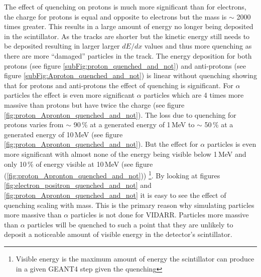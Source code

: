 The effect of quenching on protons is much more significant than for electrons, the charge for protons is equal and opposite to electrons but the mass is $\sim$ 2000 times greater. This results in a large amount of energy no longer being deposited in the scintillator. As the tracks are shorter but the kinetic energy still needs to be deposited resulting in larger larger $dE/dx$ values and thus more quenching as there are more ``damaged'' particles in the track. The energy deposition for both protons (see figure \ref{subFig:proton_quenched_and_not}) and anti-protons (see figure \ref{subFig:Aproton_quenched_and_not}) is linear without quenching showing that for protons and anti-protons the effect of quenching is significant. For $\alpha$ particles the effect is even more significant $\alpha$ particles which are 4 times more massive than protons but have twice the charge (see figure \ref{fig:proton_Apronton_quenched_and_not}). The loss due to quenching for protons varies from $\sim$ 90\,\% at a generated energy of 1\,MeV to $\sim$ 50\,\% at a generated energy of 10\,MeV (see figure \ref{fig:proton_Apronton_quenched_and_not}). But the effect for $\alpha$ particles is even more significant with almost none of the energy being visible below 1\,MeV and only 10\,\% of energy visible at 10\,MeV (see figure (\ref{fig:proton_Apronton_quenched_and_not})) \footnote{Visible energy is the maximum amount of energy the scintillator can produce in a given GEANT4 step given the quenching}. By looking at figures \ref{fig:electron_positron_quenched_and_not} and \ref{fig:proton_Apronton_quenched_and_not} it is easy to see the effect of quenching scaling with mass. This is the primary reason why simulating particles more massive than $\alpha$ particles is not done for VIDARR. Particles more massive than $\alpha$ particles will be quenched to such a point that they are unlikely to deposit a noticeable amount of visible energy in the detector's scintillator. 

